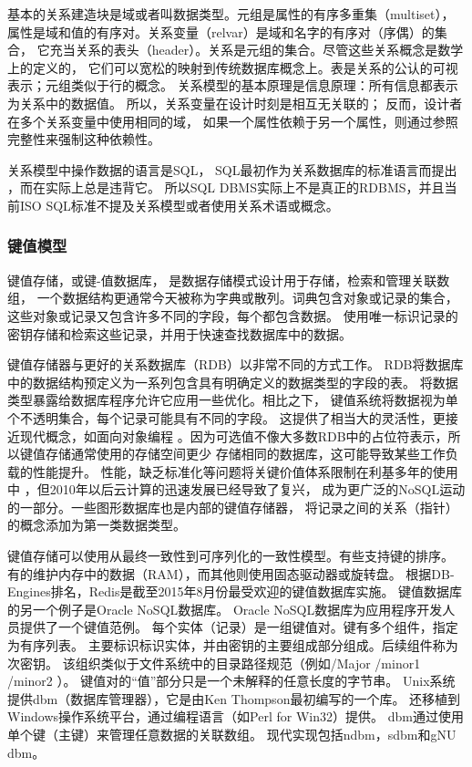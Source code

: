 基本的关系建造块是域或者叫数据类型。元组是属性的有序多重集（multiset），
属性是域和值的有序对。关系变量（relvar）是域和名字的有序对（序偶）的集合，
它充当关系的表头（header）。关系是元组的集合。尽管这些关系概念是数学上的定义的，
它们可以宽松的映射到传统数据库概念上。表是关系的公认的可视表示；元组类似于行的概念。
关系模型的基本原理是信息原理：所有信息都表示为关系中的数据值。
所以，关系变量在设计时刻是相互无关联的；
反而，设计者在多个关系变量中使用相同的域，
如果一个属性依赖于另一个属性，则通过参照完整性来强制这种依赖性。

关系模型中操作数据的语言是SQL，
SQL最初作为关系数据库的标准语言而提出
，而在实际上总是违背它。
所以SQL DBMS实际上不是真正的RDBMS，并且当前ISO SQL标准不提及关系模型或者使用关系术语或概念。
\subsubsection{键值模型}
键值存储，或键-值数据库，
是数据存储模式设计用于存储，检索和管理关联数组，
一个数据结构更通常今天被称为字典或散列。词典包含对象或记录的集合，
这些对象或记录又包含许多不同的字段，每个都包含数据。
使用唯一标识记录的密钥存储和检索这些记录，并用于快速查找数据库中的数据。

键值存储器与更好的关系数据库（RDB）以非常不同的方式工作。
RDB将数据库中的数据结构预定义为一系列包含具有明确定义的数据类型的字段的表。
将数据类型暴露给数据库程序允许它应用一些优化。相比之下，
键值系统将数据视为单个不透明集合，每个记录可能具有不同的字段。
这提供了相当大的灵活性，更接近现代概念，如面向对象编程
。因为可选值不像大多数RDB中的占位符表示，所以键值存储通常使用的存储空间更少 存储相同的数据库，这可能导致某些工作负载的性能提升。
性能，缺乏标准化等问题将关键价值体系限制在利基多年的使用中
，但2010年以后云计算的迅速发展已经导致了复兴，
成为更广泛的NoSQL运动的一部分。一些图形数据库也是内部的键值存储器，
将记录之间的关系（指针）的概念添加为第一类数据类型。

键值存储可以使用从最终一致性到可序列化的一致性模型。有些支持键的排序。
有的维护内存中的数据（RAM），而其他则使用固态驱动器或旋转盘。
根据DB-Engines排名，Redis是截至2015年8月份最受欢迎的键值数据库实施。
键值数据库的另一个例子是Oracle NoSQL数据库。
Oracle NoSQL数据库为应用程序开发人员提供了一个键值范例。
每个实体（记录）是一组键值对。键有多个组件，指定为有序列表。
主要标识标识实体，并由密钥的主要组成部分组成。后续组件称为次密钥。
该组织类似于文件系统中的目录路径规范（例如/Major /minor1 /minor2 ）。
键值对的“值”部分只是一个未解释的任意长度的字节串。
Unix系统提供dbm（数据库管理器），它是由Ken Thompson最初编写的一个库。
还移植到Windows操作系统平台，通过编程语言（如Perl for Win32）提供。
dbm通过使用单个键（主键）来管理任意数据的关联数组。
现代实现包括ndbm，sdbm和gNU dbm。
